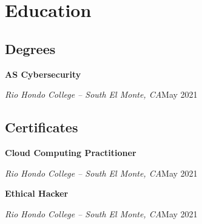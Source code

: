 \documentclass[a4paper]{article}
\begin{document}
\section{Education}
\subsection{Degrees}
\textbf{AS Cybersecurity}\par
\textit{Rio Hondo College -- South El Monte, CA}\hfill May 2021

\subsection{Certificates}
\textbf{Cloud Computing Practitioner}\par
\textit{Rio Hondo College -- South El Monte, CA}\hfill May 2021

\textbf{Ethical Hacker}\par
\textit{Rio Hondo College -- South El Monte, CA}\hfill May 2021
\end{document}
